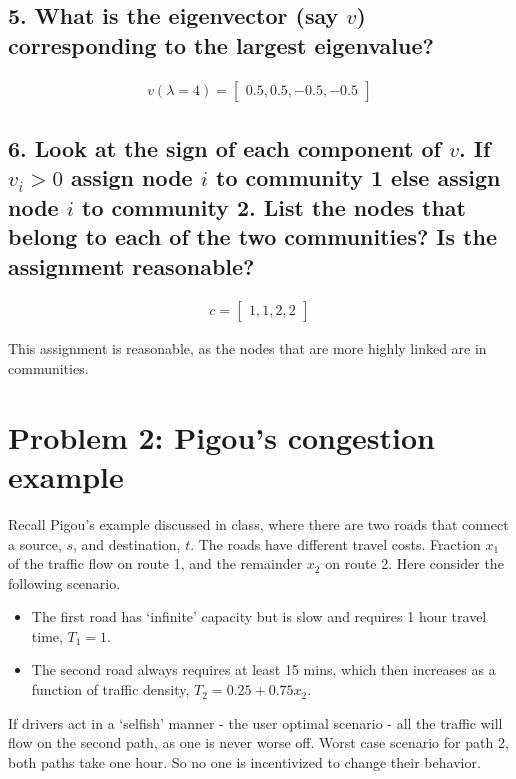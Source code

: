 \documentclass{tufte-handout}
\begin{document}
\subsection{5. What is the eigenvector (say $v$) corresponding to the largest eigenvalue?}

\begin{align*}
v(\lambda = 4) =
\begin{bmatrix} 0.5,  0.5, -0.5, -0.5
\end{bmatrix}
\end{align*}

\subsection{6. Look at the sign of each component of $v$. If $v_i > 0$ assign node $i$ to community 1 else assign node $i$ to community 2. List the nodes that belong to each of the two communities? Is the assignment reasonable?}

\begin{align*}
c =
\begin{bmatrix} 1, 1, 2, 2
\end{bmatrix}
\end{align*}

This assignment is reasonable, as the nodes that are more highly linked are in communities.

\section{Problem 2: Pigou's congestion example}
Recall Pigou's example discussed in class, where there are two roads that connect a source, $s$, and destination, $t$. The roads have different travel costs. Fraction $x_1$ of the traffic flow on route 1, and the remainder $x_2$ on route 2. Here consider the following scenario.

\begin{itemize}
\item The first road has `infinite' capacity but is slow and requires 1 hour travel time, $T_1 = 1$.
\item The second road always requires at least 15 mins, which then increases as a function of traffic density, $T_2 = 0.25 + 0.75 x_2$.
\end{itemize}
If drivers act in a `selfish' manner - the user optimal scenario - all the traffic will flow on the second path, as one is never worse off. Worst case scenario for path 2, both paths take one hour. So no one is incentivized to change their behavior.
\end{document}
